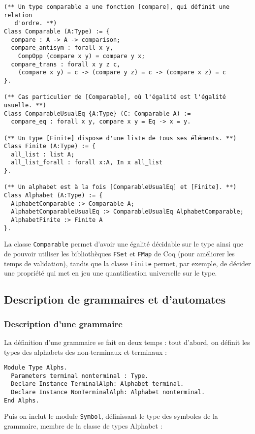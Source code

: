 \documentclass[a4paper,11pt]{article}
\begin{document}
\begin{verbatim}
(** Un type comparable a une fonction [compare], qui définit une relation
   d'ordre. **)
Class Comparable (A:Type) := {
  compare : A -> A -> comparison;
  compare_antisym : forall x y,
    CompOpp (compare x y) = compare y x;
  compare_trans : forall x y z c,
    (compare x y) = c -> (compare y z) = c -> (compare x z) = c
}.

(** Cas particulier de [Comparable], où l'égalité est l'égalité usuelle. **)
Class ComparableUsualEq {A:Type} (C: Comparable A) :=
  compare_eq : forall x y, compare x y = Eq -> x = y.

(** Un type [Finite] dispose d'une liste de tous ses éléments. **)
Class Finite (A:Type) := {
  all_list : list A;
  all_list_forall : forall x:A, In x all_list
}.

(** Un alphabet est à la fois [ComparableUsualEq] et [Finite]. **)
Class Alphabet (A:Type) := {
  AlphabetComparable :> Comparable A;
  AlphabetComparableUsualEq :> ComparableUsualEq AlphabetComparable;
  AlphabetFinite :> Finite A
}.
\end{verbatim}

La classe \verb+Comparable+ permet d'avoir une égalité décidable sur
le type ainsi que de pouvoir utiliser les bibliothèques \verb+FSet+ et
\verb+FMap+ de Coq (pour améliorer les temps de validation), tandis
que la classe \verb+Finite+ permet, par exemple, de décider une
propriété qui met en jeu une quantification universelle sur le type.

\subsection{Description de grammaires et d'automates}

\subsubsection{Description d'une grammaire}

La définition d'une grammaire se fait en deux temps : tout d'abord, on
définit les types des alphabets des non-terminaux et terminaux :

\begin{verbatim}
Module Type Alphs.
  Parameters terminal nonterminal : Type.
  Declare Instance TerminalAlph: Alphabet terminal.
  Declare Instance NonTerminalAlph: Alphabet nonterminal.
End Alphs.
\end{verbatim}

Puis on inclut le module \verb+Symbol+, définissant le type des
symboles de la grammaire, membre de la classe de types Alphabet :
\end{document}
